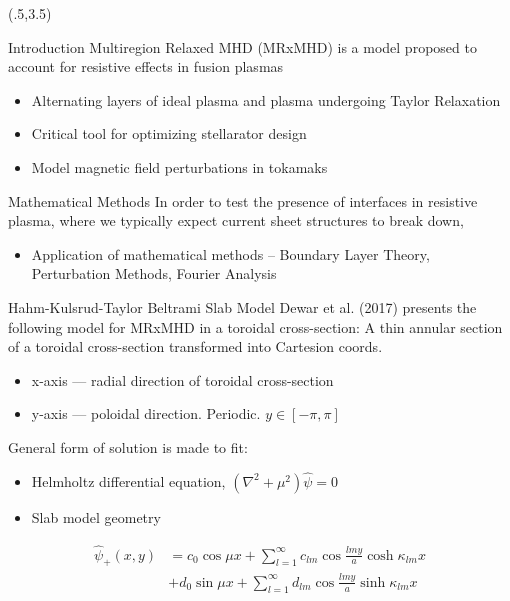 \documentclass{beamer}
\begin{document}
\begin{frame}[t]
\begin{textblock}{15}(.5,3.5)
{\Large
\begin{block}{Introduction}
Multiregion Relaxed MHD (MRxMHD) is a model proposed to account for resistive effects in fusion plasmas
\begin{itemize}
    \item Alternating layers of ideal plasma and plasma undergoing Taylor Relaxation 
    \item Critical tool for optimizing stellarator design
    \item Model magnetic field perturbations in tokamaks
\end{itemize}
\end{block}


\begin{block}{Mathematical Methods}
In order to test the presence of interfaces in resistive plasma, where we typically expect current sheet structures to break down,
\begin{itemize}
    \item Application of mathematical methods -- Boundary Layer Theory, Perturbation Methods, Fourier Analysis
\end{itemize}
\end{block}



\begin{block}{Hahm-Kulsrud-Taylor Beltrami Slab Model}
Dewar et al. (2017) presents the following model for MRxMHD in a toroidal cross-section:
A thin annular section of a toroidal cross-section transformed into Cartesion coords.
\begin{itemize}
    \item x-axis --- radial direction of toroidal cross-section
    \item y-axis --- poloidal direction. Periodic. $y \in [-\pi,\pi]$
\end{itemize}
General form of solution is made to fit:
\begin{itemize}
    \item Helmholtz differential equation, $\left( \nabla^2 + \mu^2 \right) \hat{\psi}=0$
    \item Slab model geometry
\end{itemize}

\begin{equation}
    \begin{split}
        \hat{\psi}_+ (x,y) & = c_0\cos{\mu x} + \sum_{l=1}^{\infty} c_{lm} \cos{\frac{lmy}{a}} \cosh{\kappa_{lm} x} \\
                           & + d_0 \sin{\mu x} + \sum_{l=1}^{\infty} d_{lm} \cos{\frac{lmy}{a}} \sinh{\kappa_{lm} x}
    \end{split}
\end{equation} 


\end{block}}
\end{textblock}
\end{frame}
\end{document}
